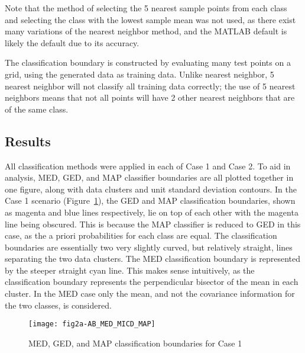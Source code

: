 Note that the method of selecting the 5 nearest sample points from each class and selecting the class with the lowest sample mean was not used, as there exist many variations of the nearest neighbor method, and the MATLAB default is likely the default due to its accuracy.

The classification boundary is constructed by evaluating many test points on a grid, using the generated data as training data. Unlike nearest neighbor, 5 nearest neighbor will not classify all training data correctly; the use of 5 nearest neighbors means that not all points will have 2 other nearest neighbors that are of the same class.



\subsection{Results}
All classification methods were applied in each of Case 1 and Case 2. To aid in analysis, MED, GED, and MAP classifier boundaries are all plotted together in one figure, along with data clusters and unit standard deviation contours. In the Case 1 scenario (Figure~\ref{fig:med_ged_map_classifier_case1}), the GED and MAP classification boundaries, shown as magenta and blue lines respectively, lie on top of each other with the magenta line being obscured. This is because the MAP classifier is reduced to GED in this case, as the a priori probabilities for each class are equal. The classification boundaries are essentially two very slightly curved, but relatively straight, lines separating the two data clusters. The MED classification boundary is represented by the steeper straight cyan line. This makes sense intuitively, as the classification boundary represents the perpendicular bisector of the mean in each cluster. In the MED case only the mean, and not the covariance information for the two classes, is considered.

\begin{figure}[ht]
\centering
	{
	\texttt{[image: fig2a-AB\_MED\_MICD\_MAP]}
	}
	
	\caption{MED, GED, and MAP classification boundaries for Case 1}
	\label{fig:med_ged_map_classifier_case1}
\end{figure}

